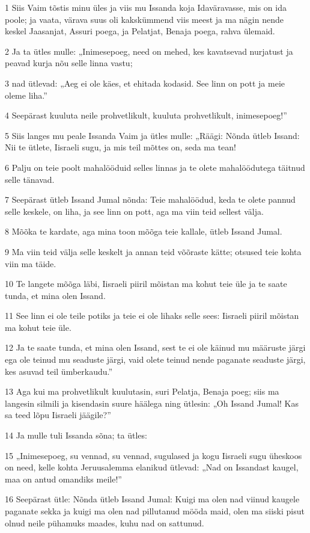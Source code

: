 \par 1 Siis Vaim tõstis minu üles ja viis mu Issanda koja Idaväravasse, mis on ida poole; ja vaata, värava suus oli kakskümmend viis meest ja ma nägin nende keskel Jaasanjat, Assuri poega, ja Pelatjat, Benaja poega, rahva ülemaid.
\par 2 Ja ta ütles mulle: „Inimesepoeg, need on mehed, kes kavatsevad nurjatust ja peavad kurja nõu selle linna vastu;
\par 3 nad ütlevad: „Aeg ei ole käes, et ehitada kodasid. See linn on pott ja meie oleme liha.”
\par 4 Seepärast kuuluta neile prohvetlikult, kuuluta prohvetlikult, inimesepoeg!”
\par 5 Siis langes mu peale Issanda Vaim ja ütles mulle: „Räägi: Nõnda ütleb Issand: Nii te ütlete, Iisraeli sugu, ja mis teil mõttes on, seda ma tean!
\par 6 Palju on teie poolt mahalööduid selles linnas ja te olete mahalöödutega täitnud selle tänavad.
\par 7 Seepärast ütleb Issand Jumal nõnda: Teie mahalöödud, keda te olete pannud selle keskele, on liha, ja see linn on pott, aga ma viin teid sellest välja.
\par 8 Mõõka te kardate, aga mina toon mõõga teie kallale, ütleb Issand Jumal.
\par 9 Ma viin teid välja selle keskelt ja annan teid võõraste kätte; otsused teie kohta viin ma täide.
\par 10 Te langete mõõga läbi, Iisraeli piiril mõistan ma kohut teie üle ja te saate tunda, et mina olen Issand.
\par 11 See linn ei ole teile potiks ja teie ei ole lihaks selle sees: Iisraeli piiril mõistan ma kohut teie üle.
\par 12 Ja te saate tunda, et mina olen Issand, sest te ei ole käinud mu määruste järgi ega ole teinud mu seaduste järgi, vaid olete teinud nende paganate seaduste järgi, kes asuvad teil ümberkaudu.”
\par 13 Aga kui ma prohvetlikult kuulutasin, suri Pelatja, Benaja poeg; siis ma langesin silmili ja kisendasin suure häälega ning ütlesin: „Oh Issand Jumal! Kas sa teed lõpu Iisraeli jäägile?”
\par 14 Ja mulle tuli Issanda sõna; ta ütles:
\par 15 „Inimesepoeg, su vennad, su vennad, sugulased ja kogu Iisraeli sugu üheskoos on need, kelle kohta Jeruusalemma elanikud ütlevad: „Nad on Issandast kaugel, maa on antud omandiks meile!”
\par 16 Seepärast ütle: Nõnda ütleb Issand Jumal: Kuigi ma olen nad viinud kaugele paganate sekka ja kuigi ma olen nad pillutanud mööda maid, olen ma siiski pisut olnud neile pühamuks maades, kuhu nad on sattunud.
